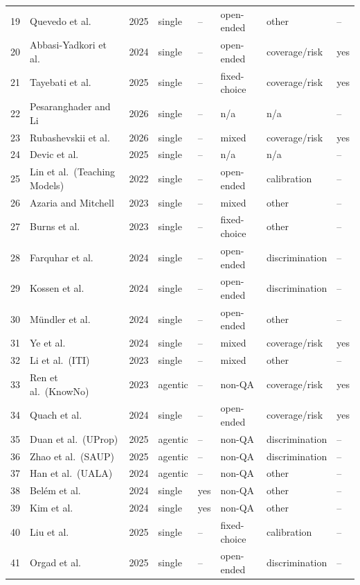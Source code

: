 \documentclass[acmsmall]{acmart}
\begin{document}
{\begin{longtable}{@{}r p{4.1cm} r l l l l l@{}}
19 & Quevedo et al. & 2025 & single & -- & open-ended & other & -- \\
20 & Abbasi-Yadkori et al. & 2024 & single & -- & open-ended & coverage/risk & yes \\
21 & Tayebati et al. & 2025 & single & -- & fixed-choice & coverage/risk & yes \\
22 & Pesaranghader and Li & 2026 & single & -- & n/a & n/a & -- \\
23 & Rubashevskii et al. & 2026 & single & -- & mixed & coverage/risk & yes \\
24 & Devic et al. & 2025 & single & -- & n/a & n/a & -- \\
25 & Lin et al.\ (Teaching Models) & 2022 & single & -- & open-ended & calibration & -- \\
26 & Azaria and Mitchell & 2023 & single & -- & mixed & other & -- \\
27 & Burns et al. & 2023 & single & -- & fixed-choice & other & -- \\
28 & Farquhar et al. & 2024 & single & -- & open-ended & discrimination & -- \\
29 & Kossen et al. & 2024 & single & -- & open-ended & discrimination & -- \\
30 & M\"undler et al. & 2024 & single & -- & open-ended & other & -- \\
31 & Ye et al. & 2024 & single & -- & mixed & coverage/risk & yes \\
32 & Li et al.\ (ITI) & 2023 & single & -- & mixed & other & -- \\
33 & Ren et al.\ (KnowNo) & 2023 & agentic & -- & non-QA & coverage/risk & yes \\
34 & Quach et al. & 2024 & single & -- & open-ended & coverage/risk & yes \\
35 & Duan et al.\ (UProp) & 2025 & agentic & -- & non-QA & discrimination & -- \\
36 & Zhao et al.\ (SAUP) & 2025 & agentic & -- & non-QA & discrimination & -- \\
37 & Han et al.\ (UALA) & 2024 & agentic & -- & non-QA & other & -- \\
38 & Bel\'em et al. & 2024 & single & yes & non-QA & other & -- \\
39 & Kim et al. & 2024 & single & yes & non-QA & other & -- \\
40 & Liu et al. & 2025 & single & -- & fixed-choice & calibration & -- \\
41 & Orgad et al. & 2025 & single & -- & open-ended & discrimination & -- \\

\end{longtable}}
\end{document}
